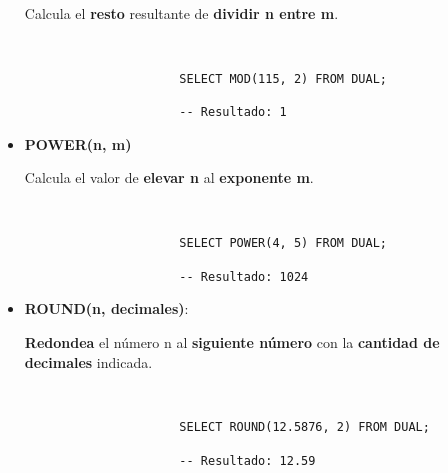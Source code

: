 \begin{itemize}
    Calcula el \textbf{resto} resultante de \textbf{dividir n entre m}.

    \begin{figure}[H]
        \begin{tcolorbox}[sharp corners, colback=yellow!30, colframe=white!20]
            \scriptsize
            \begin{verbatim}


                SELECT MOD(115, 2) FROM DUAL;

                -- Resultado: 1
            \end{verbatim}
        \end{tcolorbox}
    \end{figure}

    \item \textbf{POWER(n, m)}

    Calcula el valor de \textbf{elevar n} al \textbf{exponente m}.

    \begin{figure}[H]
        \begin{tcolorbox}[sharp corners, colback=yellow!30, colframe=white!20]
            \scriptsize
            \begin{verbatim}


                SELECT POWER(4, 5) FROM DUAL;

                -- Resultado: 1024
            \end{verbatim}
        \end{tcolorbox}
    \end{figure}

    \item \textbf{ROUND(n, decimales)}:

    \textbf{Redondea} el número n al \textbf{siguiente número} con la \textbf{cantidad de decimales} indicada.

    \begin{figure}[H]
        \begin{tcolorbox}[sharp corners, colback=yellow!30, colframe=white!20]
            \scriptsize
            \begin{verbatim}


                SELECT ROUND(12.5876, 2) FROM DUAL;

                -- Resultado: 12.59
            \end{verbatim}
        \end{tcolorbox}
    \end{figure}


\end{itemize}
